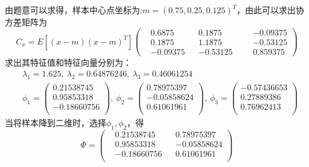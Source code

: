 \documentclass[a4paper, UTF8, 12pt]{ctexart}
\begin{document}
    由题意可以求得，样本中心点坐标为:$m=(0.75,  0.25,  0.125)^T$，由此可以求出协方差矩阵为
    \begin{equation*}
        C_x =E\left[(x-m)(x-m)^T\right] \left(
        \begin{aligned}
            &0.6875   &&0.1875  &&& -0.09375 \\
            &0.1875   && 1.1875  &&& -0.53125 \\
            &-0.09375  &&-0.53125  &&& 0.859375
        \end{aligned}\right)
    \end{equation*}
    求出其特征值和特征向量分别为：
    \begin{equation*}
        \begin{aligned}
        &\lambda_1=1.625, \  \lambda_2=0.64876246, \  \lambda_3=0.46061254 \\
        &\phi_1 =\left(
        \begin{aligned}
            0.21538745  \\
            0.95853318  \\
            -0.18660756  \\
        \end{aligned}\right), \ 
        \phi_2 =\left(
        \begin{aligned}
            0.78975397 \\
            -0.05858624  \\
            0.61061961  \\
        \end{aligned}\right), \ 
        \phi_3 =\left(
        \begin{aligned}
            -0.57436653 \\
            0.27889386 \\
            0.76962413 \\
        \end{aligned}\right)
        \end{aligned}
    \end{equation*}
    当将样本降到二维时，选择$\phi_1,\phi_2$，得
    \begin{equation*}
        \Phi =\left(
        \begin{aligned}
            &0.21538745  &&0.78975397\\
            &0.95853318  &&-0.05858624\\
            &-0.18660756  &&0.61061961 \\
        \end{aligned}\right)
    \end{equation*}
\end{document}
